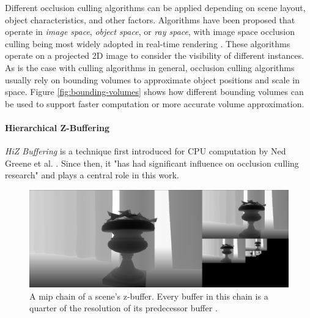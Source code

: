 \noindent
Different occlusion culling algorithms can be applied depending on scene layout, object characteristics, and other 
factors. Algorithms have been proposed that operate in \emph{image space}, \emph{object space}, or \emph{ray space}, 
with image space occlusion culling being most widely adopted in real-time rendering \cite{AkenineMoeller2018}. 
These algorithms operate on a projected 2D image to consider the visibility of different instances. As is the case 
with culling algorithms in general, occlusion culling algorithms usually rely on bounding volumes to approximate 
object positions and scale in space. Figure \ref{fig:bounding-volumes} shows how different bounding volumes can be 
used to support faster computation or more accurate volume approximation.


\paragraph*{Hierarchical Z-Buffering} \label{subsubsec-hierarchical-z-buffering}

\emph{\ac{HiZ} Buffering} is a technique first introduced for \ac{CPU} computation by Ned Greene et al. 
\cite{Greene93,Greene95}. Since then, it "has had significant influence on occlusion culling research" 
\cite{AkenineMoeller2018} and plays a central role in this work. \\

\begin{figure}[h]
    \centering
    \includegraphics[width=\linewidth]{images/graphics/hiz-mip-chain.jpg}
    \caption{A mip chain of a scene's z-buffer. Every buffer in this chain is a quarter of the resolution of its 
    predecessor buffer \cite{Schachtschabel2017}.}
    \label{fig:hiz-mip-chain}
\end{figure}

